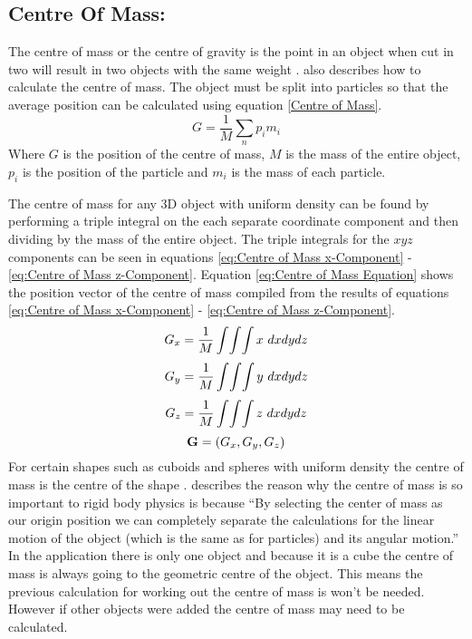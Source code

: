 \subsection{Centre Of Mass:}\label{sc:COM}

The centre of mass or the centre of gravity is the point in an object when cut in two will result in two objects with the same weight \citep{millington2007game}. 
\citet{millington2007game} also describes how to calculate the centre of mass.
The object must be split into particles so that the average position can be calculated using equation \ref{Centre of Mass}. 
\begin{equation}\label{Centre of Mass}
   G=\frac{1}{M}\sum _{n}{p}_{i}{m}_{i} 
\end{equation}
Where $G$ is the position of the centre of mass, $M$ is the mass of the entire object, ${p}_{i}$ is the position of the particle and ${m}_{i}$ is the mass of each particle.

The centre of mass for any 3D object with uniform density can be found by performing a triple integral on the each separate coordinate component and then dividing by the mass of the entire object.
The triple integrals for the $xyz$ components can be seen in equations \ref{eq:Centre of Mass x-Component} - \ref{eq:Centre of Mass z-Component}.
Equation \ref{eq:Centre of Mass Equation} shows the position vector of the centre of mass compiled from the results of equations \ref{eq:Centre of Mass x-Component} - \ref{eq:Centre of Mass z-Component}.
\begin{equation} \label{eq:Centre of Mass x-Component}
	\centering
   G_{x}=\frac{1}{M}\int\!\int\!\int x\ dx dy dz
\end{equation}
\begin{equation} \label{eq:Centre of Mass y-Component}
	\centering
   G_{y}=\frac{1}{M}\int\!\int\!\int y\ dx dy dz
\end{equation}
\begin{equation} \label{eq:Centre of Mass z-Component}
	\centering
   G_{z}=\frac{1}{M}\int\!\int\!\int z\ dx dy dz
\end{equation}
\begin{equation} \label{eq:Centre of Mass Equation}
	\centering
   \mathbf{G}=(G_{x},G_{y},G_{z})
\end{equation}
For certain shapes such as cuboids and spheres with uniform density the centre of mass is the centre of the shape \citep{millington2007game}.
\citet{millington2007game} describes the reason why the centre of mass is so important to rigid body physics is because “By selecting the center of mass as our origin position we can completely separate the calculations for the linear motion of the object (which is the same as for particles) and its angular motion.” 
In the application there is only one object and because it is a cube the centre of mass is always going to the geometric centre of the object.
This means the previous calculation for working out the centre of mass is won't be needed.
However if other objects were added the centre of mass may need to be calculated.  
